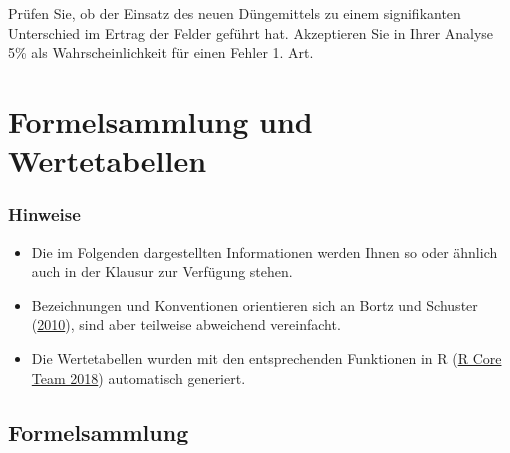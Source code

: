 \documentclass[
  11pt,
  ngerman,
  a4paper,
]{report}
\providecommand{\tightlist}{%
  \setlength{\itemsep}{0pt}\setlength{\parskip}{0pt}}
\begin{document}
Prüfen Sie, ob der Einsatz des neuen Düngemittels zu einem signifikanten Unterschied im Ertrag der Felder geführt hat. Akzeptieren Sie in Ihrer Analyse 5\% als Wahrscheinlichkeit für einen Fehler 1. Art.

\hypertarget{formeln}{%
\chapter*{Formelsammlung und Wertetabellen}\label{formeln}}

\hypertarget{hinweise}{%
\subsection*{Hinweise}\label{hinweise}}

\begin{itemize}
\tightlist
\item
  Die im Folgenden dargestellten Informationen werden Ihnen so oder ähnlich auch in der Klausur zur Verfügung stehen.
\item
  Bezeichnungen und Konventionen orientieren sich an Bortz und Schuster (\protect\hyperlink{ref-bortz}{2010}), sind aber teilweise abweichend vereinfacht.
\item
  Die Wertetabellen wurden mit den entsprechenden Funktionen in R (\protect\hyperlink{ref-r}{R Core Team 2018}) automatisch generiert.
\end{itemize}

\pagebreak

\hypertarget{formelsammlung}{%
\section*{Formelsammlung}\label{formelsammlung}}
\end{document}
